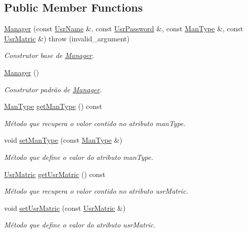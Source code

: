\subsection*{Public Member Functions}
\begin{DoxyCompactItemize}
\item 
\hyperlink{classManager_ad2ee8089f5e80bc03fabcf9a493d045b}{Manager} (const \hyperlink{classUsrName}{Usr\-Name} \&, const \hyperlink{classUsrPassword}{Usr\-Password} \&, const \hyperlink{classUsrType}{Man\-Type} \&, const \hyperlink{classUsrMatric}{Usr\-Matric} \&)  throw (invalid\-\_\-argument)
\begin{DoxyCompactList}\small\item\em Construtor base de \hyperlink{classManager}{Manager}. \end{DoxyCompactList}\item 
\hyperlink{classManager_a1658ff9f18e38ccd9cb8b0b371b9c20b}{Manager} ()
\begin{DoxyCompactList}\small\item\em Construtor padrão de \hyperlink{classManager}{Manager}. \end{DoxyCompactList}\item 
\hyperlink{classUsrType}{Man\-Type} \hyperlink{classManager_a255ac6a7e2112631001296fa8db3811b}{get\-Man\-Type} () const 
\begin{DoxyCompactList}\small\item\em Método que recupera o valor contido no atributo man\-Type. \end{DoxyCompactList}\item 
void \hyperlink{classManager_a3d4e9cb6cc0e8d9be47fcc086b4e584e}{set\-Man\-Type} (const \hyperlink{classUsrType}{Man\-Type} \&)
\begin{DoxyCompactList}\small\item\em Método que define o valor do atributo man\-Type. \end{DoxyCompactList}\item 
\hyperlink{classUsrMatric}{Usr\-Matric} \hyperlink{classManager_a462f3704b016b57e087db417df73f07a}{get\-Usr\-Matric} () const 
\begin{DoxyCompactList}\small\item\em Método que recupera o valor contido no atributo usr\-Matric. \end{DoxyCompactList}\item 
void \hyperlink{classManager_a93309a0dde84dd0b5fe90d9e1da49822}{set\-Usr\-Matric} (const \hyperlink{classUsrMatric}{Usr\-Matric} \&)
\begin{DoxyCompactList}\small\item\em Método que define o valor do atributo usr\-Matric. \end{DoxyCompactList}\end{DoxyCompactItemize}
